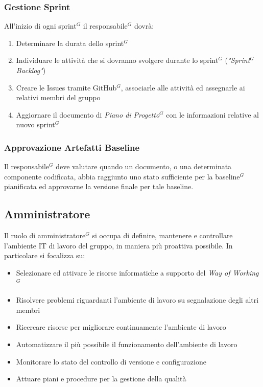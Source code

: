\documentclass[a4paper,10pt]{article}
\begin{document}
\subsubsection{Gestione Sprint}
All'inizio di ogni sprint$^G$ il responsabile$^G$ dovrà:
\begin{enumerate}
  \item Determinare la durata dello sprint$^G$
  \item Individuare le attività che si dovranno svolgere durante lo sprint$^G$ (\textit{"Sprint$^G$ Backlog"})
  \item Creare le Issues tramite GitHub$^G$, associarle alle attività ed assegnarle ai relativi membri del gruppo  
  \item Aggiornare il documento di \textit{Piano di Progetto$^G$} con le informazioni relative al nuovo sprint$^G$
\end{enumerate}
\subsubsection{Approvazione Artefatti Baseline}
Il responsabile$^G$ deve valutare quando un documento, o una determinata componente codificata, abbia raggiunto
uno stato sufficiente per la baseline$^G$ pianificata ed approvarne la versione finale per tale baseline.

\subsection{Amministratore}
Il ruolo di amministratore$^G$ si occupa di definire, mantenere e controllare l'ambiente IT di lavoro del gruppo, in 
maniera più proattiva possibile. In particolare si focalizza su:
\begin{itemize}
  \item Selezionare ed attivare le risorse informatiche a supporto del \textit{Way of Working$^G$}
  \item Risolvere problemi riguardanti l'ambiente di lavoro su segnalazione degli altri membri
  \item Ricercare risorse per migliorare continuamente l'ambiente di lavoro
  \item Automatizzare il più possibile il funzionamento dell'ambiente di lavoro
  \item Monitorare lo stato del controllo di versione e configurazione 
  \item Attuare piani e procedure per la gestione della qualità
\end{itemize}
\end{document}
